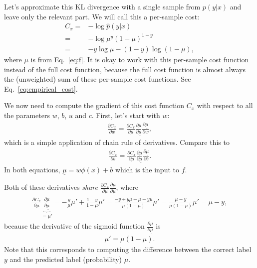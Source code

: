\documentclass{report}
\begin{document}
Let's approximate this KL divergence with a single sample from $p(y|x)$ and
leave only the relevant part. We will call this a per-sample cost:
\begin{align}
    \label{eq:cost_bernoulli}
    C_x =& - \log \hat{p}(y|x) \\
    =& - \log \mu^y (1-\mu)^{1-y} \\
    =& - y \log \mu - (1-y) \log (1-\mu),
\end{align}
where $\mu$ is from Eq.~\eqref{eq:f}.  It is okay to work with this per-sample
cost function instead of the full cost function, because the full cost function
is almost always the (unweighted) sum of these per-sample cost functions. See
Eq.~\eqref{eq:empirical_cost}.

We now need to compute the gradient of this cost function $C_x$ with respect to
all the parameters $w$, $b$, $u$ and $c$. First, let's start with $w$:
\begin{align*}
    \frac{\partial C_x}{\partial w} = \frac{\partial C_x}{\partial \mu}
    \frac{\partial \mu}{\partial \underline{\mu}}
    \frac{\partial \underline{\mu}}{\partial w},
\end{align*}
which is a simple application of chain rule of derivatives. Compare this to
\begin{align*}
    \frac{\partial C_x}{\partial b} = \frac{\partial C_x}{\partial \mu}
    \frac{\partial \mu}{\partial \underline{\mu}}
    \frac{\partial \underline{\mu}}{\partial b}.
\end{align*}
In both equations, $\underline{\mu} = w \phi(x) + b$ which is the input to $f$.


Both of these derivatives {\em share} $\frac{\partial C_x}{\partial
\mu}\frac{\partial \mu}{\partial \underline{\mu}}$, where
\begin{align}
    \label{eq:out_deriv}
    \frac{\partial C_x}{\partial \mu} \underbrace{\frac{\partial \mu}{\partial
    \underline{\mu}}}_{=\mu'} = 
    -\frac{y}{\mu}\mu' +
    \frac{1-y}{1-\mu}\mu' 
    = \frac{-y + y\mu + \mu - y\mu }{\mu(1-\mu)}\mu' 
    = \frac{\mu - y}{\mu(1-\mu)}\mu' 
    = \mu - y,
\end{align}
because the derivative of the sigmoid function $\frac{\partial \mu}{\partial
\underline{\mu}}$ is
\begin{align*}
    \mu' = \mu (1-\mu).
\end{align*}
Note that this corresponds to computing the difference between the correct label
$y$ and the predicted label (probability) $\mu$.
\end{document}
